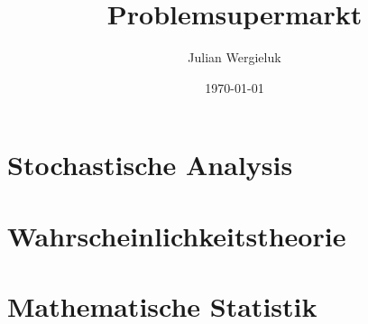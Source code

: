 \documentclass[11pt,oldfontcommands,oneside,a4paper,article]{memoir}
\title{Problemsupermarkt}\author{Julian Wergieluk}\date{\today}
\begin{document}
\pagestyle{headings}
\sloppy

\maketitle

\setcounter{tocdepth}{3}
\tableofcontents


\setcounter{secnumdepth}{4}
\renewcommand{\theparagraph}{\arabic{chapter}.\arabic{paragraph}}
\renewcommand{\theenumi}{\Alph{enumi}.}
\renewcommand{\labelenumi}{\theenumi}


\chapter{Stochastische Analysis}


\chapter{Wahrscheinlichkeitstheorie}



\chapter{Mathematische Statistik}









\backmatter

\printbibliography
%
%
\end{document}
